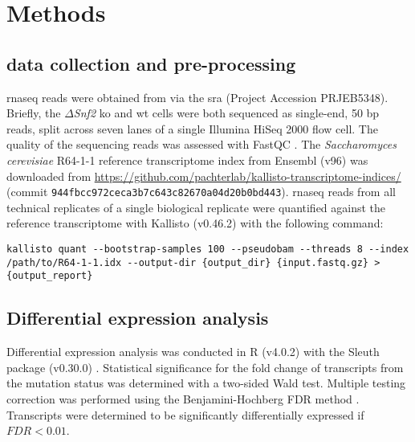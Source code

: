 \section{Methods}

\subsection{ data collection and pre-processing}

\Gls{rnaseq} reads were obtained from \cite[REF][]{gierlinskiStatisticalModelsRNAseq2015} via the \gls{sra} \cite{leinonenSequenceReadArchive2011} (Project Accession PRJEB5348).
Briefly, the $\Delta$\emph{Snf2} \gls{ko} and \gls{wt} cells were both sequenced as single-end, 50 bp reads, split across seven lanes of a single Illumina HiSeq 2000 flow cell.
The quality of the sequencing reads was assessed with FastQC \cite{andrewsFastQCQualityControl2010}.
The \emph{Saccharomyces cerevisiae} R64-1-1 reference transcriptome index from Ensembl \cite{cunninghamEnsembl20192019} (v96) was downloaded from \url{https://github.com/pachterlab/kallisto-transcriptome-indices/} (commit \texttt{944fbcc972ceca3b7c643c82670a04d20b0bd443}).
\Gls{rnaseq} reads from all technical replicates of a single biological replicate were quantified against the reference transcriptome with Kallisto (v0.46.2) \cite{brayNearoptimalProbabilisticRNAseq2016} with the following command:

\begin{lstlisting}[basicstyle=\ttfamily]
kallisto quant --bootstrap-samples 100 --pseudobam --threads 8 --index /path/to/R64-1-1.idx --output-dir {output_dir} {input.fastq.gz} > {output_report}
\end{lstlisting}

\subsection{Differential expression analysis}

Differential expression analysis was conducted in R (v4.0.2) \cite{rcoreteamLanguageEnvironmentStatistical2013} with the Sleuth package (v0.30.0) \cite{pimentelDifferentialAnalysisRNAseq2017,yiGenelevelDifferentialAnalysis2018}.
Statistical significance for the fold change of transcripts from the mutation status was determined with a two-sided Wald test.
Multiple testing correction was performed using the Benjamini-Hochberg FDR method \cite{benjaminiControllingFalseDiscovery1995}.
Transcripts were determined to be significantly differentially expressed if $FDR < 0.01$.

